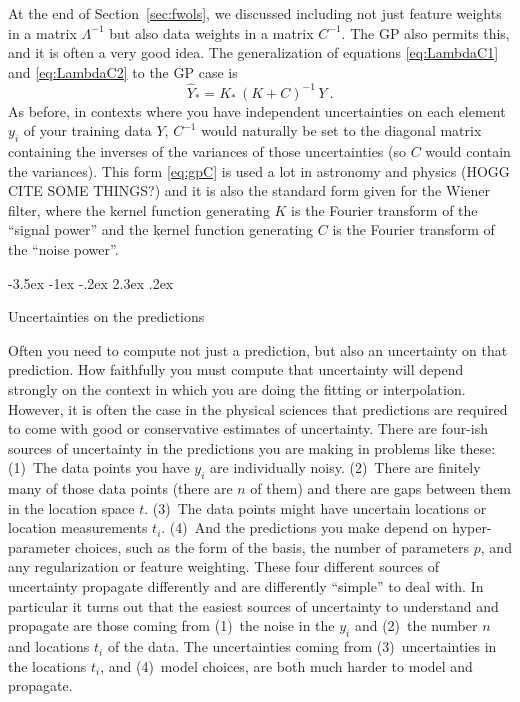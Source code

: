 \documentclass[12pt,letterpaper]{article}
\makeatletter
\renewcommand\section{\@startsection {section}{1}{\z@}%
  {-3.5ex \@plus -1ex \@minus -.2ex}%
  {2.3ex \@plus.2ex}%
  {\raggedright\normalfont\Large\bfseries}}
\newcommand{\sectionname}{Section}
\makeatother
\begin{document}
At the end of \sectionname~\ref{sec:fwols}, we discussed including not just feature weights in a matrix $\Lambda^{-1}$ but also data weights in a matrix $C^{-1}$. The GP also permits this, and it is often a very good idea. The generalization of equations \eqref{eq:LambdaC1} and \eqref{eq:LambdaC2} to the GP case is 
\begin{equation}\label{eq:gpC}
    \hat{Y}_\ast = K_\ast\,(K + C)^{-1}\,Y
    ~.
\end{equation}
As before, in contexts where you have independent uncertainties on each element $y_i$ of your training data $Y$, $C^{-1}$ would naturally be set to the diagonal matrix containing the inverses of the variances of those uncertainties (so $C$ would contain the variances).
This form \eqref{eq:gpC} is used a lot in astronomy and physics (HOGG CITE SOME THINGS?) and it is also the standard form given for the Wiener filter, where the kernel function generating $K$ is the Fourier transform of the ``signal power'' and the kernel function generating $C$ is the Fourier transform of the ``noise power''.

\section{Uncertainties on the predictions}\label{sec:uncertainty}

Often you need to compute not just a prediction, but also an uncertainty on that prediction.
How faithfully you must compute that uncertainty will depend strongly on the context in which you are doing the fitting or interpolation.
However, it is often the case in the physical sciences that predictions are required to come with good or conservative estimates of uncertainty.
There are four-ish sources of uncertainty in the predictions you are making in problems like these:
(1)~The data points you have $y_i$ are individually noisy.
(2)~There are finitely many of those data points (there are $n$ of them) and there are gaps between them in the location space $t$.
(3)~The data points might have uncertain locations or location measurements $t_i$.
(4)~And the predictions you make depend on hyper-parameter choices, such as the form of the basis, the number of parameters $p$, and any regularization or feature weighting.
These four different sources of uncertainty propagate differently and are differently ``simple'' to deal with.
In particular it turns out that the easiest sources of uncertainty to understand and propagate are those coming from (1)~the noise in the $y_i$ and (2)~the number $n$ and locations $t_i$ of the data.
The uncertainties coming from (3)~uncertainties in the locations $t_i$, and (4)~model choices, are both much harder to model and propagate.
\end{document}
